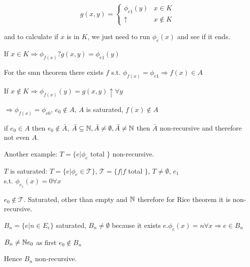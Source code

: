 \begin{equation*}
  g(x,y) = \begin{cases}
    \phi_{e1}(y) & x \in K     \\
    \uparrow     & x \not\in K
  \end{cases}
\end{equation*}

and to calculate if $x$ is in $K$, we just need to run $ \phi_e(x) $ and see if it ends.

If $ x\in K \Rightarrow \phi_{f(x)} ? g(x,y) = \phi_{e1}(y)$

For the smn theorem there exists $f$ s.t. $ \phi_{f(x)} = \phi_{e1} \Rightarrow f(x)\in A$

If $ x \not\in K \Rightarrow \phi_{f(x)}(y) = g(x,y) \uparrow \forall y $

$ \Rightarrow \phi_{f(x)} = \phi_{e0} $, $ e_0 \not\in A $, $A$ is saturated, $ f(x)\not\in A $

if $ e_0 \in A $ then $ e_0 \not \in \bar{A} $, $ \bar{A} \subseteq \mathbb{N}, \bar{A} \not= \emptyset, \bar{A}\not=\mathbb{N} $ then $ \bar{A} $ non-recursive and therefore not even $A$.


Another example: $ T = \{e | \phi_e $ total $ \} $ non-recursive.

$T$ is saturated: $ T = \{e | \phi_e \in \mathcal{T} \} $, $ \mathcal{T} = \{f | f $ total $ \} $, $ T\not=\emptyset $, $ e_1 $\\ s.t. $ \phi_{e_1}(x) = 0 \forall x $

$ e_0 \not\in \mathcal{T} $. Saturated, other than empty and $ \mathbb{N} $ therefore for Rice theorem it is non-recursive.

$ B_n = \{e | n \in E_e \} $ saturated, $ B_n \not= \emptyset $ because it exists $ e. \phi_e(x) = n \forall x \Rightarrow e \in B_n $

$ B_n \not= \mathbb{N} e_0$ as first $ e_0 \not\in B_n $

Hence $ B_n $ non-recursive.
